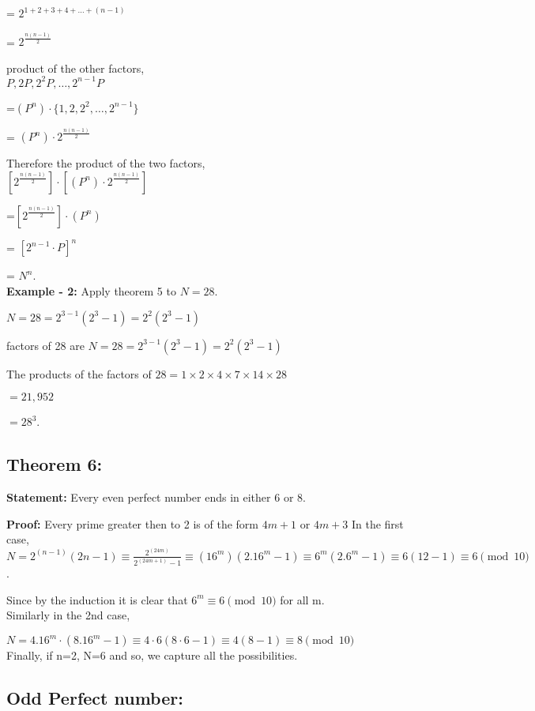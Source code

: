 \documentclass[12pt,,a4paper]{book}
\begin{document}
= \(2^{1+2+3+4+\ldots+(n-1)}\)

= \(2^{\frac{n(n-1)}{2}}\)

product of the other factors, \\
\(P, 2P, 2^2P, \ldots, 2^{n-1}P\)

=\((P^n) \cdot \{1, 2, 2^2, \ldots, 2^{n-1}\}\)

= \((P^n) \cdot 2^{\frac{n(n-1)}{2}}\)

Therefore the product of the two factors,\\
\([2^{\frac{n(n-1)}{2}}] \cdot [(P^n) \cdot 2^{\frac{n(n-1)}{2}}]\)

=\([2^{\frac{n(n-1)}{2}}] \cdot (P^n)\)

 = \([{2^{n-1} \cdot P}]^n\)

 = \(N^n\).\\

 \textbf{Example - 2:} Apply theorem 5 to \(N = 28\). 

\(N = 28 = 2^{3-1}(2^3-1) = 2^2(2^3-1)\)


factors of 28 are \(N = 28 = 2^{3-1}(2^3-1) = 2^2(2^3-1)\)


The products of the factors of \(28 = 1 \times 2 \times 4 \times 7 \times 14 \times 28\)

\(= 21,952\)


\(= 28^3\).\\

\subsection*{Theorem 6:}
\textbf{Statement:} Every even perfect number ends in either 6 or 8.

\textbf{Proof:}  Every prime greater then to 2 is of the form \(4m + 1\) or \(4m + 3\)
 In the first case,\\
\(N = 2^{(n-1)}(2n-1) \equiv \frac{2^{(24m)}}{2^{(24m+1)}-1} \equiv (16^m)(2.{16^m}-1) \equiv 6^m(2.{6^m}-1) \equiv 6(12-1) \equiv 6 \pmod{10}\).

Since by the induction it is clear that \(6^m \equiv 6 \pmod{10}\) for all m. \\
Similarly in the 2nd case,

\(N = 4.16^m \cdot (8.16^m-1) \equiv 4 \cdot 6 (8 \cdot 6-1) \equiv 4(8-1) \equiv 8 \pmod{10}\)
 \\
Finally, if n=2, N=6 and so, we capture all the possibilities. \\
\subsection{Odd Perfect number:}
\end{document}
